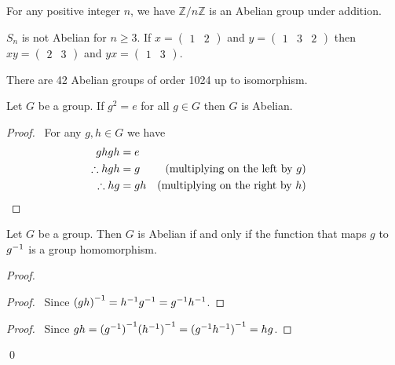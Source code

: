\begin{ex}
    For any positive integer $n$, we have $\mathbb{Z} / n \mathbb{Z}$ is an Abelian group under addition.
\end{ex}

\begin{ex}
    $S_n$ is not Abelian for $n \geq 3$. If $x = \left( \begin{array}{cc} 1 & 2 \end{array} \right)$ and $y = \left( \begin{array}{ccc} 1 & 3 & 2 \end{array} \right)$ then $xy = \left( \begin{array}{cc} 2 & 3 \end{array} \right)$ and $yx = \left( \begin{array}{cc} 1 & 3 \end{array} \right)$.
\end{ex}

\begin{ex}
There are 42 Abelian groups of order 1024 up to isomorphism. %
\end{ex}

\begin{prop}
    Let $G$ be a group. If $g^2 = e$ for all $g \in G$ then $G$ is Abelian.
\end{prop}

\begin{proof}
    \pf\ For any $g,h \in G$ we have
    \begin{align*}
        ghgh           & = e                                                   \\
        \therefore hgh & = g  & (\text{multiplying on the left by }g)          \\
        \therefore hg  & = gh & (\text{multiplying on the right by } h) & \qed
    \end{align*}
\end{proof}

\begin{prop}
    Let $G$ be a group. Then $G$ is Abelian if and only if the function that maps $g$ to $\inv{g}$ is a group homomorphism.
\end{prop}

\begin{proof}
    \pf
    \begin{proof}
        \pf\ Since $\inv{(gh)} = \inv{h} \inv{g} = \inv{g} \inv{h}$.
    \end{proof}
    \begin{proof}
        \pf\ Since $gh = \inv{(\inv{g})}\inv{(\inv{h})} = \inv{(\inv{g}\inv{h})} = hg$.
    \end{proof}
    \qed
\end{proof}

